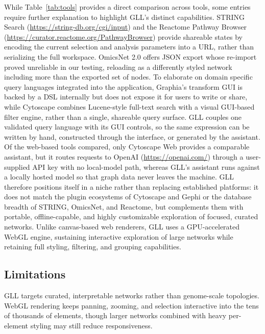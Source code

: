 While Table~\ref{tab:tools} provides a direct comparison across tools, some entries require further explanation to highlight GLL's distinct capabilities. STRING Search\citep{szklarczykSTRINGDatabase20252025} (\url{https://string-db.org/cgi/input}) and the Reactome Pathway Browser\citep{milacicReactomePathwayKnowledgebase2024} (\url{https://curator.reactome.org/PathwayBrowser}) provide shareable states by encoding the current selection and analysis parameters into a URL, rather than serializing the full workspace. OmicsNet 2.0\citep{zhouOmicsNet20Webbased2022} offers JSON export whose re-import proved unreliable in our testing, reloading as a differently styled network including more than the exported set of nodes. To elaborate on domain specific query languages integrated into the application, Graphia's\citep{freemanGraphiaPlatformGraphbased2022} transform GUI is backed by a DSL internally but does not expose it for users to write or share, while Cytoscape\citep{shannonCytoscapeSoftwareEnvironment2003} combines Lucene-style full-text search with a visual GUI-based filter engine, rather than a single, shareable query surface. GLL couples one validated query language with its GUI controls, so the same expression can be written by hand, constructed through the interface, or generated by the assistant. Of the web-based tools compared, only Cytoscape Web\citep{onoCytoscapeWebBringing2025} provides a comparable assistant, but it routes requests to OpenAI (\url{https://openai.com/}) through a user-supplied API key with no local-model path, whereas GLL's assistant runs against a locally hosted model so that graph data never leaves the machine. GLL therefore positions itself in a niche rather than replacing established platforms: it does not match the plugin ecosystems of Cytoscape and Gephi\citep{bastianGephiOpenSource2009} or the database breadth of STRING, OmicsNet, and Reactome, but complements them with portable, offline-capable, and highly customizable exploration of focused, curated networks. Unlike canvas-based web renderers, GLL uses a GPU-accelerated WebGL engine, sustaining interactive exploration of large networks while retaining full styling, filtering, and grouping capabilities.

\subsection{Limitations}
GLL targets curated, interpretable networks rather than genome-scale topologies. WebGL rendering keeps panning, zooming, and selection interactive into the tens of thousands of elements, though larger networks combined with heavy per-element styling may still reduce responsiveness.

